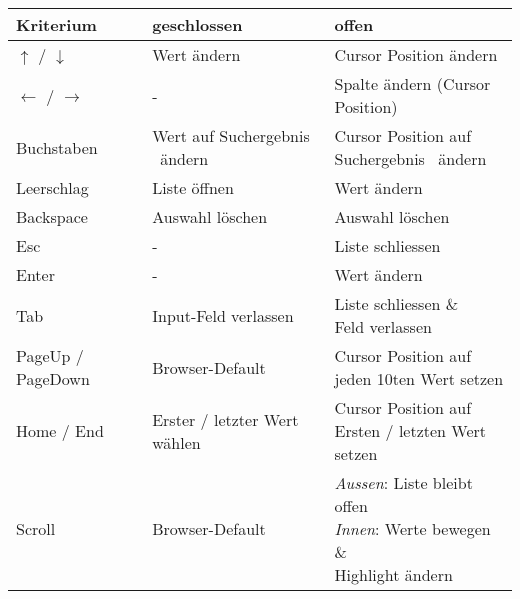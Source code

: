 \begin{table}[!htb] %
    \label{table:interactionNewComponent}
    \footnotesize
    \begin{adjustbox}{max width=\textwidth}
        \begin{threeparttable}
            \begin{tabular}{ l || l | l }
                \bf{Kriterium}    & \bf{geschlossen} & \bf{offen} \\
                \hline \hline
                $\uparrow$ / $\downarrow$     & Wert ändern       & Cursor Position ändern \\
                \hline
                $\leftarrow$ / $\rightarrow$  & -                 & Spalte ändern (Cursor Position) \\
                \hline
                Buchstaben  & Wert auf Suchergebnis\tnote{1} \ ändern & \tbbr{Cursor Position auf \\ Suchergebnis\tnote{1} \ ändern} \\
                \hline
                Leerschlag  & Liste öffnen    & Wert ändern       \\
                \hline
                Backspace   & Auswahl löschen & Auswahl löschen   \\
                \hline
                Esc         & -               & Liste schliessen  \\
                \hline \hline
                Enter       & -               & Wert ändern       \\
                \hline
                Tab         & Input-Feld verlassen            & \tbbr{Liste schliessen \& \\ Feld verlassen } \\
                \hline
                PageUp / PageDown  & Browser-Default\tnote{2} & \tbbr{Cursor Position auf \\ jeden 10ten Wert setzen} \\
                \hline
                Home / End & Erster / letzter Wert wählen     & \tbbr{Cursor Position auf \\ Ersten / letzten Wert setzen}  \\
                \hline \hline
                Scroll     & Browser-Default\tnote{2}         & \tbbr{\emph{Aussen}: Liste bleibt offen \\
                                                                    \emph{Innen}: Werte bewegen \& \\ Highlight ändern} \\

\end{tabular}
\end{threeparttable}
\end{adjustbox}
\end{table}
